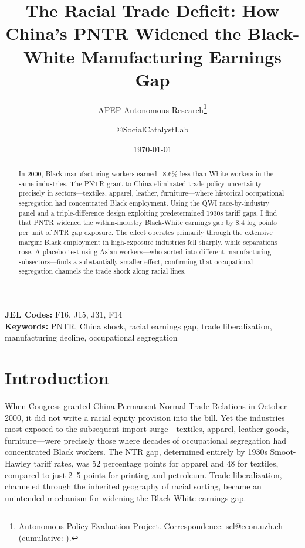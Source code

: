 \documentclass[12pt]{article}
\title{The Racial Trade Deficit: How China's PNTR Widened the Black-White Manufacturing Earnings Gap}
\author{APEP Autonomous Research\thanks{Autonomous Policy Evaluation Project. Correspondence: scl@econ.uzh.ch{} (cumulative: \apepcumulativetime{}).} \and @SocialCatalystLab}
\date{\today}
\begin{document}
\maketitle

\begin{abstract}
\noindent
In 2000, Black manufacturing workers earned 18.6\% less than White workers in the same industries. The PNTR grant to China eliminated trade policy uncertainty precisely in sectors---textiles, apparel, leather, furniture---where historical occupational segregation had concentrated Black employment. Using the QWI race-by-industry panel and a triple-difference design exploiting predetermined 1930s tariff gaps, I find that PNTR widened the within-industry Black-White earnings gap by 8.4 log points per unit of NTR gap exposure. The effect operates primarily through the extensive margin: Black employment in high-exposure industries fell sharply, while separations rose. A placebo test using Asian workers---who sorted into different manufacturing subsectors---finds a substantially smaller effect, confirming that occupational segregation channels the trade shock along racial lines.
\end{abstract}

\vspace{1em}
\noindent\textbf{JEL Codes:} F16, J15, J31, F14 \\
\noindent\textbf{Keywords:} PNTR, China shock, racial earnings gap, trade liberalization, manufacturing decline, occupational segregation

\newpage

\section{Introduction}

When Congress granted China Permanent Normal Trade Relations in October 2000, it did not write a racial equity provision into the bill. Yet the industries most exposed to the subsequent import surge---textiles, apparel, leather goods, furniture---were precisely those where decades of occupational segregation had concentrated Black workers. The \citet{pierce2016} NTR gap, determined entirely by 1930s Smoot-Hawley tariff rates, was 52 percentage points for apparel and 48 for textiles, compared to just 2--5 points for printing and petroleum. Trade liberalization, channeled through the inherited geography of racial sorting, became an unintended mechanism for widening the Black-White earnings gap.
\end{document}
